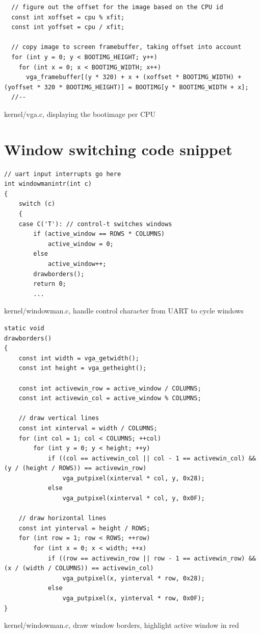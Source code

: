 \begin{appendices}
\begin{listing}[H]
\begin{verbatim}
  // figure out the offset for the image based on the CPU id
  const int xoffset = cpu % xfit;
  const int yoffset = cpu / xfit;

  // copy image to screen framebuffer, taking offset into account
  for (int y = 0; y < BOOTIMG_HEIGHT; y++)
    for (int x = 0; x < BOOTIMG_WIDTH; x++)
      vga_framebuffer[(y * 320) + x + (xoffset * BOOTIMG_WIDTH) + (yoffset * 320 * BOOTIMG_HEIGHT)] = BOOTIMG[y * BOOTIMG_WIDTH + x];
  //--
    \end{verbatim}
    \caption{kernel/vga.c, displaying the bootimage per CPU}
\end{listing}

\section{Window switching code snippet}
\label{appendix:c:6}
\begin{listing}[H]
  \begin{verbatim}
// uart input interrupts go here
int windowmanintr(int c)
{
    switch (c)
    {
    case C('T'): // control-t switches windows
        if (active_window == ROWS * COLUMNS)
            active_window = 0;
        else
            active_window++;
        drawborders();
        return 0;
        ...
  \end{verbatim}
  \caption{kernel/windowman.c, handle control character from UART to cycle windows}
\end{listing}

\begin{listing}[H]
  \begin{verbatim}
static void
drawborders()
{
    const int width = vga_getwidth();
    const int height = vga_getheight();

    const int activewin_row = active_window / COLUMNS;
    const int activewin_col = active_window % COLUMNS;

    // draw vertical lines
    const int xinterval = width / COLUMNS;
    for (int col = 1; col < COLUMNS; ++col)
        for (int y = 0; y < height; ++y)
            if ((col == activewin_col || col - 1 == activewin_col) && (y / (height / ROWS)) == activewin_row)
                vga_putpixel(xinterval * col, y, 0x28);
            else
                vga_putpixel(xinterval * col, y, 0x0F);

    // draw horizontal lines
    const int yinterval = height / ROWS;
    for (int row = 1; row < ROWS; ++row)
        for (int x = 0; x < width; ++x)
            if ((row == activewin_row || row - 1 == activewin_row) && (x / (width / COLUMNS)) == activewin_col)
                vga_putpixel(x, yinterval * row, 0x28);
            else
                vga_putpixel(x, yinterval * row, 0x0F);
}
  \end{verbatim}
  \caption{kernel/windowman.c, draw window borders, highlight active window in red}
\end{listing}


\end{appendices}
